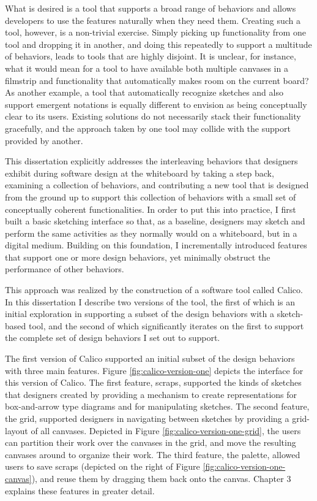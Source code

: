 What is desired is a tool that supports a broad range of behaviors and allows developers to use the features naturally when they need them. Creating such a tool, however, is a non-trivial exercise. Simply picking up functionality from one tool and dropping it in another, and doing this repeatedly to support a multitude of behaviors, leads to tools that are highly disjoint. It is unclear, for instance, what it would mean for a tool to have available both multiple canvases in a filmstrip and functionality that automatically makes room on the current board? As another example, a tool that automatically recognize sketches and also support emergent notations is equally different to envision as being conceptually clear to its users. Existing solutions do not necessarily stack their functionality gracefully, and the approach taken by one tool may collide with the support provided by another.

This dissertation explicitly addresses the interleaving behaviors that designers exhibit during software design at the whiteboard by taking a step back, examining a collection of behaviors, and contributing a new tool that is designed from the ground up to support this collection of behaviors with a small set of conceptually coherent functionalities. In order to put this into practice, I first built a basic sketching interface so that, as a baseline, designers may sketch and perform the same activities as they normally would on a whiteboard, but in a digital medium. Building on this foundation, I incrementally introduced features that support one or more design behaviors, yet minimally obstruct the performance of other behaviors. 

This approach was realized by the construction of a software tool called Calico. In this dissertation I describe two versions of the tool, the first of which is an initial exploration in supporting a subset of the design behaviors with a sketch-based tool, and the second of which significantly iterates on the first to support the complete set of design behaviors I set out to support. 

The first version of Calico supported an initial subset of the design behaviors with three main features. Figure \ref{fig:calico-version-one} depicts the interface for this version of Calico. The first feature, scraps, supported the kinds of sketches that designers created by providing a mechanism to create representations for box-and-arrow type diagrams and for manipulating sketches. The second feature, the grid, supported designers in navigating between sketches by providing a grid-layout of all canvases. Depicted in Figure \ref{fig:calico-version-one-grid}, the users can partition their work over the canvases in the grid, and move the resulting canvases around to organize their work. The third feature, the palette, allowed users to save scraps (depicted on the right of Figure \ref{fig:calico-version-one-canvas}), and reuse them by dragging them back onto the canvas. Chapter 3 explains these features in greater detail.

